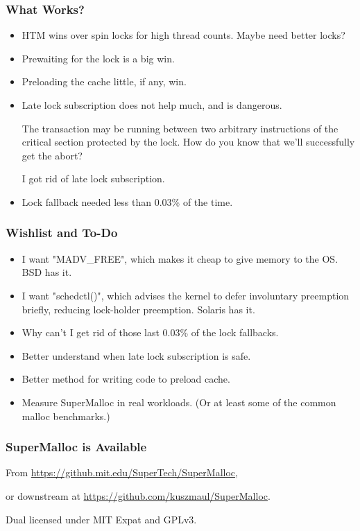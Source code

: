 \documentclass[xcolor=dvipsnames,14pt]{beamer}
\begin{document}
\begin{frame}
\frametitle{What Works?}

\begin{itemize}
\item HTM wins over spin locks for high thread counts.  Maybe need better locks?
\item Prewaiting for the lock is a big win.
\item Preloading the cache little, if any, win.
\item Late lock subscription does not help much, and is dangerous.  

The transaction may be running between two arbitrary instructions of
the critical section protected by the lock.  How do you know that
we'll successfully get the abort?

I got rid of late lock subscription.
\item Lock fallback needed less than 0.03\% of the time.
\end{itemize}
\end{frame}

\begin{frame}[fragile]
\frametitle{Wishlist and To-Do}

\begin{itemize}
\item I want "MADV_FREE", which makes it cheap to give memory to the OS\@.  BSD has it.
\item I want "schedctl()", which advises the kernel to defer
  involuntary preemption briefly, reducing lock-holder preemption.  Solaris has it.
\item Why can't I get rid of those last 0.03\% of the lock fallbacks.
\item Better understand when late lock subscription is safe.
\item Better method for writing code to preload cache.
\item Measure SuperMalloc in real workloads.  (Or at least some of the
  common malloc benchmarks.)
\end{itemize}

\end{frame}

\begin{frame}
\frametitle{SuperMalloc is Available}

From {\small \url{https://github.mit.edu/SuperTech/SuperMalloc}},

or downstream at {\small \url{https://github.com/kuszmaul/SuperMalloc}}.

Dual licensed under MIT Expat and GPLv3.
\end{frame}
\end{document}
